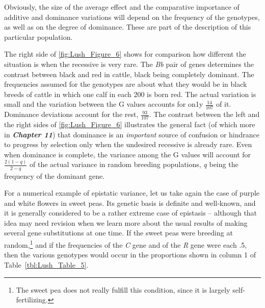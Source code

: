 {Obviously, the size of the average effect and the comparative importance
of additive and dominance variations will depend on the frequency
of the genotypes, as well as on the degree of dominance. These are
part of the description of this particular population.

The right side of \ref{fig:Lush_Figure_6} shows for comparison how different the
situation is when the recessive is very rare. The \textit{Bb} pair of genes
determines the contrast between black and red in cattle, black being completely
dominant. The frequencies assumed for the genotypes are about what they would be
in black breeds of cattle in which one calf in each 200 is born red. The actual
variation is small and the variation between the G values accounts for on1y
$\frac{14}{107}$ of it. Dominance deviations account for the rest, $\frac{93}{107}$.
The contrast between the left and the right sides of \ref{fig:Lush_Figure_6}
illustrates the general fact (of which more in \textbf{\textit{Chapter 11}}) that
dominance is an \textit{important} source of confusion or hindrance to progress by selection
only when the undesired recessive is already rare. Even when dominance is complete,
the variance among the G values will account for $\frac{2(1-q)}{2-q}$ of the actual
variance\label{page79} in random breeding populations, \textit{q} being the frequency of the
dominant gene.

For a numerical example of epistatic variance, let us take again the
case of purple and white flowers in sweet peas. Its genetic basis is definite
and well-known, and it is generally considered to be a rather
extreme case of epistasis -- although that idea may need revision when
we learn more about the usual results of making several gene substitutions
at one time. If the sweet peas were breeding at random,\footnote{The sweet pea does
not really fulfill this condition, since it is largely self-fertilizing.} and if the
frequencies of the \textit{C} gene and of the \textit{R} gene were each .5, then
the various genotypes would occur in the proportions shown in column 1 of
Table~\ref{tbl:Lush_Table_5}.

}
